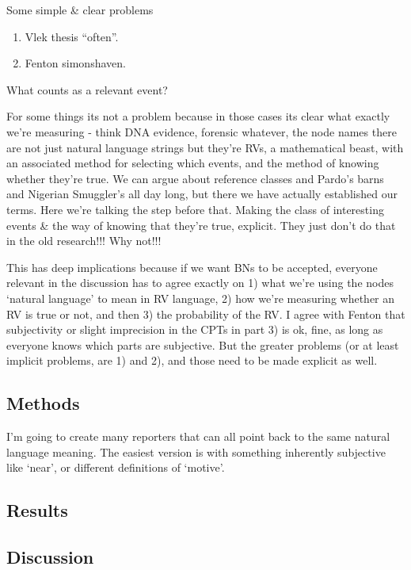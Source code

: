 Some simple \& clear problems

\begin{enumerate}
\item Vlek thesis ``often''. 
\item Fenton simonshaven.
\end{enumerate}

What counts as a relevant event?

For some things its not a problem because in those cases its clear what exactly we're measuring - think DNA evidence, forensic whatever, the node names there are not just natural language strings but they're RVs, a mathematical beast, with an associated method for selecting which events, and the method of knowing whether they're true. We can argue about reference classes and Pardo's barns and Nigerian Smuggler's all day long, but there we have actually established our terms. Here we're talking the step before that. Making the class of interesting events \& the way of knowing that they're true, explicit. They just don't do that in the old research!!! Why not!!!

This has deep implications because if we want BNs to be accepted, everyone relevant in the discussion has to agree exactly on 1) what we're using the nodes `natural language' to mean in RV language, 2) how we're measuring whether an RV is true or not, and then 3) the probability of the RV. I agree with Fenton that subjectivity or slight imprecision in the CPTs in part 3) is ok, fine, as long as everyone knows which parts are subjective. But the greater problems (or at least implicit problems, are 1) and 2), and those need to be made explicit as well.

\subsection{Methods}
I'm going to create many reporters that can all point back to the same natural language meaning. The easiest version is with something inherently subjective like `near', or different definitions of `motive'.

\subsection{Results}

\subsection{Discussion}



